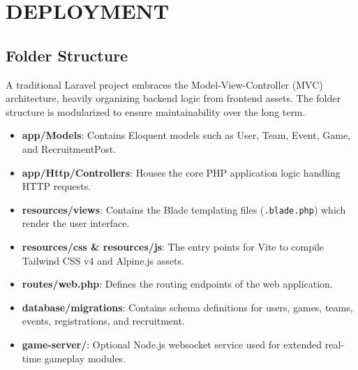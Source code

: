\chapter{DEPLOYMENT}
\section{Folder Structure}
A traditional Laravel project embraces the Model-View-Controller (MVC) architecture, heavily organizing backend logic from frontend assets. The folder structure is modularized to ensure maintainability over the long term.

\begin{itemize}
    \item \textbf{app/Models}: Contains Eloquent models such as User, Team, Event, Game, and RecruitmentPost.
    \item \textbf{app/Http/Controllers}: Houses the core PHP application logic handling HTTP requests.
    \item \textbf{resources/views}: Contains the Blade templating files (\texttt{.blade.php}) which render the user interface.
    \item \textbf{resources/css \& resources/js}: The entry points for Vite to compile Tailwind CSS v4 and Alpine.js assets.
    \item \textbf{routes/web.php}: Defines the routing endpoints of the web application.
    \item \textbf{database/migrations}: Contains schema definitions for users, games, teams, events, registrations, and recruitment.
    \item \textbf{game-server/}: Optional Node.js websocket service used for extended real-time gameplay modules.
\end{itemize}

